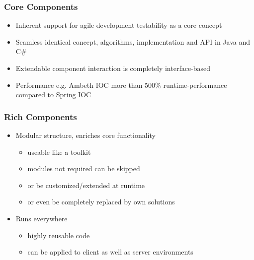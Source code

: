 \def\showimgref{img/platform-overview.png}

\subsubsection{Core Components}
\begin{itemize}
	\item Inherent support for agile development \newline testability as a core concept
	\item Seamless \newline identical concept, algorithms, implementation and API in Java and C\#
	\item Extendable \newline component interaction is completely interface-based
	\item Performance \newline e.g. Ambeth IOC more than 500\% runtime-performance compared to Spring IOC
\end{itemize}

\subsubsection{Rich Components}
\begin{itemize}
	\item Modular structure, enriches core functionality
	\begin{itemize}
		\item useable like a toolkit
		\item modules not required can be skipped
		\item or be customized/extended at runtime
		\item or even be completely replaced by own solutions
	\end{itemize}
	\item Runs everywhere
	\begin{itemize}
		\item highly reusable code
		\item can be applied to client as well as server environments
	\end{itemize}
\end{itemize}


